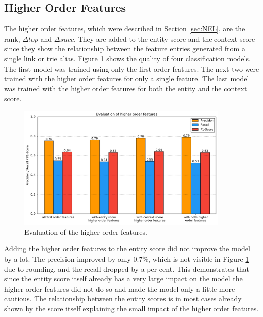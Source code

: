 \subsection{Higher Order Features}
The higher order features, which were described in Section \ref{sec:NEL}, are the rank, $\Delta top$ and $\Delta succ$. They are added to the entity score and the context score since they show the relationship between the feature entries generated from a single link or trie alias. Figure \ref{ho_eval_gen} shows the quality of four classification models. The first model was trained using only the first order features. The next two were trained with the higher order features for only a single feature. The last model was trained with the higher order features for both the entity and the context score.\par
\begin{figure}[H]
	\centering
	\includegraphics[width=0.9\textwidth]{img/higher_order_eval}
	\caption{Evaluation of the higher order features.}
	\label{ho_eval_gen}
\end{figure}
Adding the higher order features to the entity score did not improve the model by a lot. The precision improved by only $0.7\%$, which is not visible in Figure \ref{ho_eval_gen} due to rounding, and the recall dropped by a per cent. This demonstrates that since the entity score itself already has a very large impact on the model the higher order features did not do so and made the model only a little more cautious. The relationship between the entity scores is in most cases already shown by the score itself explaining the small impact of the higher order features.\par
